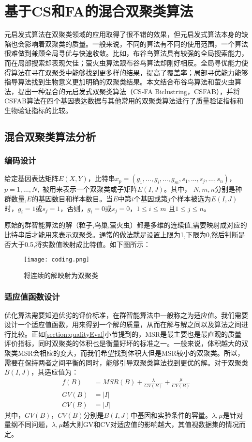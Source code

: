 \chapter{基于CS和FA的混合双聚类算法}
元启发式算法在双聚类领域的应用取得了很不错的效果，但元启发式算法本身的缺陷也会影响着双聚类的质量。一般来说，不同的算法有不同的使用范围，一个算法很难做到兼顾全局寻优与快速收敛。比如，布谷鸟算法具有较强的全局搜索能力，而在局部搜索却表现欠佳；萤火虫算法跟布谷鸟算法却刚好相反。全局寻优能力使得算法在寻在双聚类中能够找到更多样的结果，提高了覆盖率；局部寻优能力能够指导算法找到生物意义更加明确的双聚类结果。本文结合布谷鸟算法和萤火虫算法，提出一种混合的元启发式双聚类算法（CS-FA Biclustring，CSFAB），并将CSFAB算法在四个基因表达数据与其他常用的双聚类算法进行了质量验证指标和生物验证指标的比较。

\section{混合双聚类算法分析}
    \subsection{编码设计}
    给定基因表达矩阵$E(X,Y)$，比特串$x_p = (g_1,\dots,g_i,\dots,g_m,s_1,\dots,s_j,\dots,s_n)$，$ p=1,\dots,N, $ 被用来表示一个双聚类或子矩阵$E(I,J)$。其中， $N,m,n$分别是种群数量,$E$的基因数目和样本数目。当$E$中第$i$个基因或第$j$个样本被选为$E(I,J)$时，$g_i=1$或$s_j=1$，否则，$g_i=0$或$s_j=0$，$1\le i \le m$ 且$1\le j \le n$。

    原始的群智能算法的解（粒子,鸟巢,萤火虫）都是多维的连续值,需要映射成对应的比特串后才能用来表示双聚类。通常的做法就是设置上限为1,下限为0,然后判断是否大于0.5,将实数值映射成比特值。如下图所示：
    \begin{figure}[htbp]
        \centering
        \texttt{[image: coding.png]}
        \caption{将连续的解映射为双聚类}
        \label{fig:encoding}
    \end{figure}

    \subsection{适应值函数设计}\label{sec:fitness}
    优化算法需要知道优劣的评价标准，在群智能算法中一般称之为适应值。我们需要设计一个适应值函数，用来得到一个解的质量，从而在解与解之间以及算法之间进行比较。正如\ref{section:qualityEval}小节提到的，MSR是最主要也是最直观的质量评价指标，同时双聚类的体积也是衡量好坏的标准之一。一般来说，体积越大的双聚类MSR会相应的变大，而我们希望找到体积大但是MSR较小的双聚类。所以，需要在保持两者之间平衡的同时，能够引导双聚类算法找到更优的解。对于双聚类$B(I,J)$，其适应值为：
    \begin{align}
      f(B) &= MSR(B) + \frac{\lambda}{GV(B)} +\frac{\mu}{CV(B)} \\
      GV(B) & = |I| \\
      CV(B) & = |J|
    \end{align}
    其中，$GV(B)$，$CV(B)$分别是$B(I,J)$中基因和实验条件的容量。$\lambda,\mu$是针对量纲不同问题，$\lambda,\mu$越大则GV和CV对适应值的影响越大，其值视数据集的情况而定。
    
